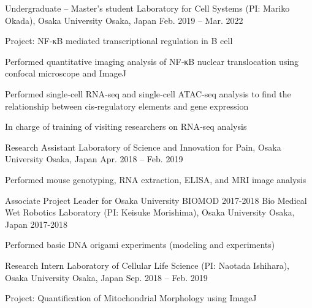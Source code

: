\begin{cventries}
  \cventry
    {Undergraduate – Master’s student} %
    {Laboratory for Cell Systems (PI: Mariko Okada), Osaka University} %
    {Osaka, Japan} %
    {Feb. 2019 – Mar. 2022} %
    {
      \begin{cvitems} %
        \item {Project: NF‑κB mediated transcriptional regulation in B cell}
        \item {Performed quantitative imaging analysis of NF‑κB nuclear translocation using confocal microscope and ImageJ}
        \item {Performed single‑cell RNA‑seq and single‑cell ATAC‑seq analysis to find the relationship between cis‑regulatory elements and gene expression}
        \item {In charge of training of visiting researchers on RNA‑seq analysis}
      \end{cvitems}
    }
  
  \cventry
    {Research Assistant} %
    {Laboratory of Science and Innovation for Pain, Osaka University} %
    {Osaka, Japan} %
    {Apr. 2018 – Feb. 2019} %
    {
      \begin{cvitems} %
        \item {Performed mouse genotyping, RNA extraction, ELISA, and MRI image analysis}
      \end{cvitems}
    }

  \cventry
    {Associate Project Leader for Osaka University BIOMOD 2017-2018} %
    {Bio Medical Wet Robotics Laboratory (PI: Keisuke Morishima), Osaka University} %
    {Osaka, Japan} %
    {2017-2018} %
    {
      \begin{cvitems} %
        \item {Performed basic DNA origami experiments (modeling and experiments)}
      \end{cvitems}
    }

  \cventry
    {Research Intern} %
    {Laboratory of Cellular Life Science (PI: Naotada Ishihara), Osaka University} %
    {Osaka, Japan} %
    {Sep. 2018 – Feb. 2019} %
    {
      \begin{cvitems} %
        \item {Project: Quantification of Mitochondrial Morphology using ImageJ}
      \end{cvitems}
    }


\end{cventries}
